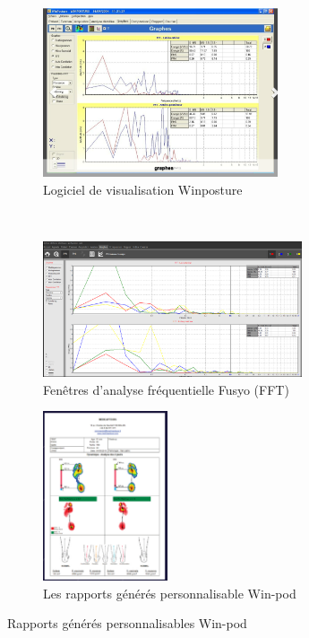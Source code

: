 \begin{figure}[H]
    \centering
    \begin{subfigure}[b]{0.45\textwidth}
      \centering
      \includegraphics[height=5cm]{images/pression_plantaire/winposture2.png}
    \caption{Logiciel de visualisation Winposture}\label{fig: Logiciel Winposture}
    \end{subfigure}\\
    \begin{subfigure}[b]{0.45\textwidth}
      \centering
      \includegraphics[height=4cm]{images/analyse_marche/FFT.png}
      \caption{Fenêtres d’analyse fréquentielle Fusyo (FFT)}\label{fig:FFT}
    \end{subfigure}
    \begin{subfigure}[b]{0.45\textwidth}
      \centering
      \includegraphics[height=5cm]{images/analyse_marche/WinPod4.png}
    \caption{Les rapports générés personnalisable Win-pod}\label{fig:WinPod4}
    \end{subfigure}
    \caption{Rapports générés personnalisables Win-pod}\label{fig:global2}
  \end{figure}